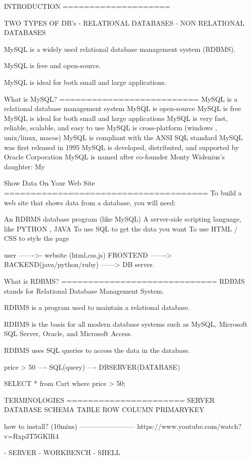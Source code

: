 



INTRODUCTION
====================

TWO TYPES OF DB's
	- RELATIONAL DATABASES 
	- NON RELATIONAL DATABASES
	
MySQL is a widely used relational database management system (RDBMS).

MySQL is free and open-source.

MySQL is ideal for both small and large applications.


What is MySQL?
==========================
MySQL is a relational database management system
MySQL is open-source
MySQL is free
MySQL is ideal for both small and large applications
MySQL is very fast, reliable, scalable, and easy to use
MySQL is cross-platform (windows , unix/linux, macos)
MySQL is compliant with the ANSI SQL standard
MySQL was first released in 1995
MySQL is developed, distributed, and supported by Oracle Corporation
MySQL is named after co-founder Monty Widenius's daughter: My


Show Data On Your Web Site
======================================
To build a web site that shows data from a database, you will need:

An RDBMS database program (like MySQL)
A server-side scripting language, like PYTHON , JAVA
To use SQL to get the data you want
To use HTML / CSS to style the page

user ------->- website (html,css,js) FRONTEND -------> BACKEND(java/python/ruby) ------> DB server.

What is RDBMS?
=============================
RDBMS stands for Relational Database Management System.

RDBMS is a program used to maintain a relational database.

RDBMS is the basis for all modern database systems such as MySQL, Microsoft SQL Server, Oracle, and Microsoft Access.

RDBMS uses SQL queries to access the data in the database.


price > 50 ---- SQL(query) ---- DBSERVER(DATABASE) 

SELECT * from Cart where price > 50;


TERMINOLOGIES 
======================
SERVER
DATABASE
SCHEMA 
TABLE 
ROW
COLUMN
PRIMARYKEY 


how to install? (10mins)
------------------------ 	
https://www.youtube.com/watch?v=Rxp3T5GKlR4

- SERVER
- WORKBENCH 
- SHELL 

